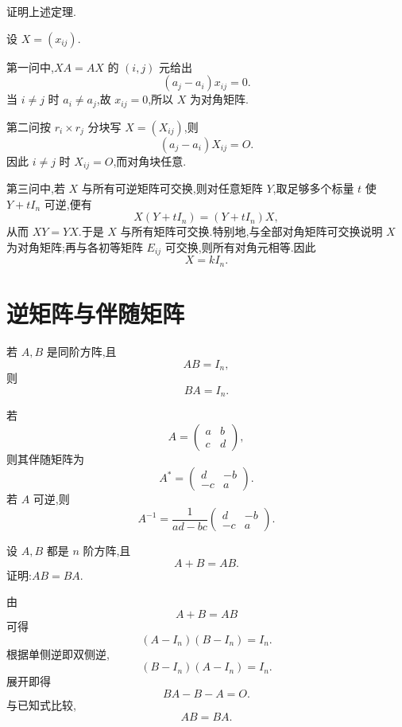 \begin{example}
证明上述定理.
\end{example}
\exampleblank

\begin{solution}
设 $X=(x_{ij})$.

第一问中,$XA=AX$ 的 $(i,j)$ 元给出
\[
(a_j-a_i)x_{ij}=0.
\]
当 $i\neq j$ 时 $a_i\neq a_j$,故 $x_{ij}=0$,所以 $X$ 为对角矩阵.

第二问按 $r_i\times r_j$ 分块写 $X=(X_{ij})$,则
\[
(a_j-a_i)X_{ij}=O.
\]
因此 $i\neq j$ 时 $X_{ij}=O$,而对角块任意.

第三问中,若 $X$ 与所有可逆矩阵可交换,则对任意矩阵 $Y$,取足够多个标量 $t$ 使 $Y+tI_n$ 可逆,便有
\[
X(Y+tI_n)=(Y+tI_n)X,
\]
从而 $XY=YX$.于是 $X$ 与所有矩阵可交换.特别地,与全部对角矩阵可交换说明 $X$ 为对角矩阵;再与各初等矩阵 $E_{ij}$ 可交换,则所有对角元相等.因此
\[
\boxed{X=kI_n}.
\]
\end{solution}


\newpage

\section{逆矩阵与伴随矩阵}

\begin{theorem}[\markstar]
若 $A,B$ 是同阶方阵,且
\[
AB=I_n,
\]
则
\[
BA=I_n.
\]
\end{theorem}

\begin{proposition}[\markstar]
若
\[
A=\begin{pmatrix}a&b\\c&d\end{pmatrix},
\]
则其伴随矩阵为
\[
A^*=\begin{pmatrix}d&-b\\-c&a\end{pmatrix}.
\]
若 $A$ 可逆,则
\[
A^{-1}
=\dfrac{1}{ad-bc}
\begin{pmatrix}d&-b\\-c&a\end{pmatrix}.
\]
\end{proposition}

\begin{example}
设 $A,B$ 都是 $n$ 阶方阵,且
\[
A+B=AB.
\]
证明:$AB=BA$.
\end{example}
\exampleblank

\begin{solution}
由
\[
A+B=AB
\]
可得
\[
(A-I_n)(B-I_n)=I_n.
\]
根据单侧逆即双侧逆,
\[
(B-I_n)(A-I_n)=I_n.
\]
展开即得
\[
BA-B-A=O.
\]
与已知式比较,
\[
\boxed{AB=BA}.
\]
\end{solution}

